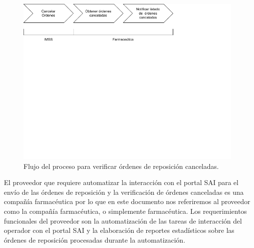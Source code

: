 \documentclass[a4paper,10pt]{article}
\begin{document}
\begin{itemize}
\begin{figure}[h]
\includegraphics[scale=0.3]{flujo-proceso-verificar} 
\caption{Flujo del proceso para verificar órdenes de reposición canceladas.}
\label{fig:flow-proc-verificar}
\end{figure}
\end{itemize}

El proveedor que requiere automatizar la interacción con el portal SAI para el envío de las órdenes de reposición y la verificación de órdenes canceladas es una compañía farmacéutica por lo que en este documento nos referiremos al proveedor como la compañía farmacéutica, o simplemente farmacéutica. Los requerimientos funcionales del proveedor son la automatización de las tareas de interacción del operador con el portal SAI y la elaboración de reportes estadísticos sobre las órdenes de reposición procesadas durante la automatización.
\end{document}
